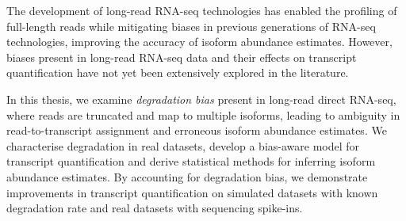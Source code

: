 
The development of long-read RNA-seq technologies has enabled the profiling of full-length reads while mitigating biases in previous generations of RNA-seq technologies, improving the accuracy of isoform abundance estimates. However, biases present in long-read RNA-seq data and their effects on transcript quantification have not yet been extensively explored in the literature. 

In this thesis, we examine \textit{degradation bias} present in long-read direct RNA-seq, where reads are truncated and map to multiple isoforms, leading to ambiguity in read-to-transcript assignment and erroneous isoform abundance estimates. We characterise degradation in real datasets, develop a bias-aware model for transcript quantification and derive statistical methods for inferring isoform abundance estimates. By accounting for degradation bias, we demonstrate improvements in transcript quantification on simulated datasets with known degradation rate and real datasets with sequencing spike-ins.

